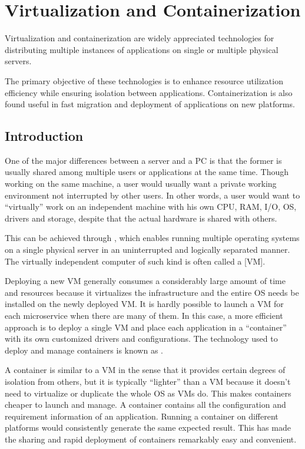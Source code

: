 \chapter{Virtualization and Containerization} \label{ch:vac}

Virtualization and containerization are widely appreciated technologies for distributing multiple instances of applications on single or multiple physical servers. 

The primary objective of these technologies is to enhance resource utilization efficiency while ensuring isolation between applications. Containerization is also found useful in fast migration and deployment of applications on new platforms.

\section{Introduction}

One of the major differences between a server and a PC is that the former is usually shared among multiple users or applications at the same time. Though working on the same machine, a user would usually want a private working environment not interrupted by other users. In other words, a user would want to ``virtually'' work on an independent machine with his own CPU, RAM, I/O, OS, drivers and storage, despite that the actual hardware is shared with others. 

This can be achieved through , which enables running multiple operating systems on a single physical server in an uninterrupted and logically separated manner. The virtually independent computer of such kind is often called a [VM].

Deploying a new VM generally consumes a considerably large amount of time and resources because it virtualizes the infrastructure and the entire OS needs be installed on the newly deployed VM. It is hardly possible to launch a VM for each microservice when there are many of them. In this case, a more efficient approach is to deploy a single VM and place each application in a ``container'' with its own customized drivers and configurations. The technology used to deploy and manage containers is known as .

A container is similar to a VM in the sense that it provides certain degrees of isolation from others, but it is typically ``lighter'' than a VM because it doesn't need to virtualize or duplicate the whole OS as VMs do. This makes containers cheaper to launch and manage. A container contains all the configuration and requirement information of an application. Running a container on different platforms would consistently generate the same expected result. This has made the sharing and rapid deployment of containers remarkably easy and convenient. 

